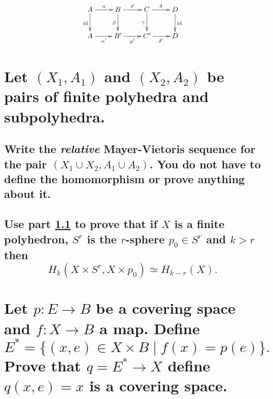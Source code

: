 \documentclass[10pt]{article}
\begin{document}
\[ \xymatrix{
  A \ar[r]^\alpha\ar[d]_{\mathrm{id}}&B\ar[r]^\varphi \ar[d]_\beta  &C \ar[r]^\delta \ar[d]_\gamma &D\ar[d]^{\mathrm{id}}\\
  A \ar[r]_{\alpha'} &B'\ar[r]_{\varphi'} &C'\ar[r]_{\delta'} &D }\]


\section{Let $(X_1, A_1)$ and $(X_2, A_2)$ be pairs of finite polyhedra and subpolyhedra.}

\subsection{Write the \emph{relative} Mayer-Vietoris sequence for the pair $(X_1 \cup X_2, A_1 \cup
  A_2)$. You do not have to define the homomorphism or prove anything about it.}
\label{prev}

\subsection{Use part \ref{prev} to prove that if $X$ is a finite polyhedron, $S^r$ is the $r$-sphere
  $p_0 \in S^r$ and $k >r$ then $$H_k(X \times S^r, X \times p_0) \simeq H_{k-r}(X).$$}

\section{Let $p: E \to B$ be a covering space and $f: X \to B$ a map. Define
$$E^* = \{ (x,e) \in X \times B \mid f(x) =p(e)\}.$$
Prove that $q = E^* \to X $ define $q(x,e) = x $ is a covering space.}
\end{document}

